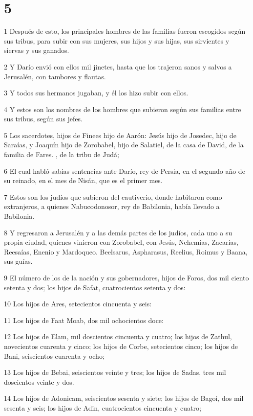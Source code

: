 \chapter{5}

\par 1 Después de esto, los principales hombres de las familias fueron escogidos según sus tribus, para subir con sus mujeres, sus hijos y sus hijas, sus sirvientes y siervas y sus ganados.
\par 2 Y Darío envió con ellos mil jinetes, hasta que los trajeron sanos y salvos a Jerusalén, con tambores y flautas.
\par 3 Y todos sus hermanos jugaban, y él los hizo subir con ellos.
\par 4 Y estos son los nombres de los hombres que subieron según sus familias entre sus tribus, según sus jefes.
\par 5 Los sacerdotes, hijos de Finees hijo de Aarón: Jesús hijo de Josedec, hijo de Saraías, y Joaquín hijo de Zorobabel, hijo de Salatiel, de la casa de David, de la familia de Fares. , de la tribu de Judá;
\par 6 El cual habló sabias sentencias ante Darío, rey de Persia, en el segundo año de su reinado, en el mes de Nisán, que es el primer mes.
\par 7 Estos son los judíos que subieron del cautiverio, donde habitaron como extranjeros, a quienes Nabucodonosor, rey de Babilonia, había llevado a Babilonia.
\par 8 Y regresaron a Jerusalén y a las demás partes de los judíos, cada uno a su propia ciudad, quienes vinieron con Zorobabel, con Jesús, Nehemías, Zacarías, Reesaías, Enenio y Mardoqueo. Beelsarus, Aspharasus, Reelius, Roimus y Baana, sus guías.
\par 9 El número de los de la nación y sus gobernadores, hijos de Foros, dos mil ciento setenta y dos; los hijos de Safat, cuatrocientos setenta y dos:
\par 10 Los hijos de Ares, setecientos cincuenta y seis:
\par 11 Los hijos de Faat Moab, dos mil ochocientos doce:
\par 12 Los hijos de Elam, mil doscientos cincuenta y cuatro; los hijos de Zathul, novecientos cuarenta y cinco; los hijos de Corbe, setecientos cinco; los hijos de Bani, seiscientos cuarenta y ocho;
\par 13 Los hijos de Bebai, seiscientos veinte y tres; los hijos de Sadas, tres mil doscientos veinte y dos.
\par 14 Los hijos de Adonicam, seiscientos sesenta y siete; los hijos de Bagoi, dos mil sesenta y seis; los hijos de Adin, cuatrocientos cincuenta y cuatro;
